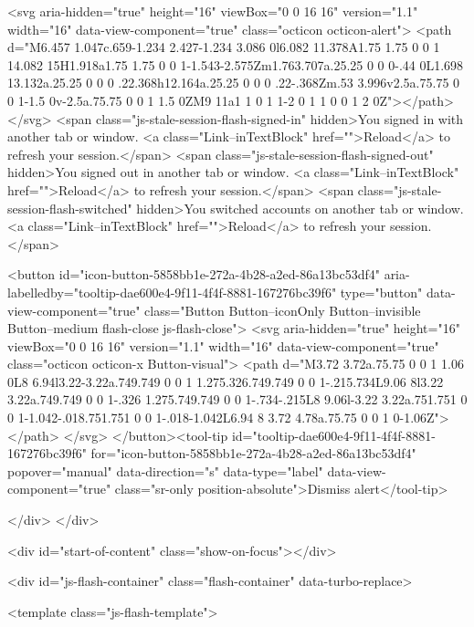         <svg aria-hidden="true" height="16" viewBox="0 0 16 16" version="1.1" width="16" data-view-component="true" class="octicon octicon-alert">
    <path d="M6.457 1.047c.659-1.234 2.427-1.234 3.086 0l6.082 11.378A1.75 1.75 0 0 1 14.082 15H1.918a1.75 1.75 0 0 1-1.543-2.575Zm1.763.707a.25.25 0 0 0-.44 0L1.698 13.132a.25.25 0 0 0 .22.368h12.164a.25.25 0 0 0 .22-.368Zm.53 3.996v2.5a.75.75 0 0 1-1.5 0v-2.5a.75.75 0 0 1 1.5 0ZM9 11a1 1 0 1 1-2 0 1 1 0 0 1 2 0Z"></path>
</svg>
        <span class="js-stale-session-flash-signed-in" hidden>You signed in with another tab or window. <a class="Link--inTextBlock" href="">Reload</a> to refresh your session.</span>
        <span class="js-stale-session-flash-signed-out" hidden>You signed out in another tab or window. <a class="Link--inTextBlock" href="">Reload</a> to refresh your session.</span>
        <span class="js-stale-session-flash-switched" hidden>You switched accounts on another tab or window. <a class="Link--inTextBlock" href="">Reload</a> to refresh your session.</span>

    <button id="icon-button-5858bb1e-272a-4b28-a2ed-86a13bc53df4" aria-labelledby="tooltip-dae600e4-9f11-4f4f-8881-167276bc39f6" type="button" data-view-component="true" class="Button Button--iconOnly Button--invisible Button--medium flash-close js-flash-close">  <svg aria-hidden="true" height="16" viewBox="0 0 16 16" version="1.1" width="16" data-view-component="true" class="octicon octicon-x Button-visual">
    <path d="M3.72 3.72a.75.75 0 0 1 1.06 0L8 6.94l3.22-3.22a.749.749 0 0 1 1.275.326.749.749 0 0 1-.215.734L9.06 8l3.22 3.22a.749.749 0 0 1-.326 1.275.749.749 0 0 1-.734-.215L8 9.06l-3.22 3.22a.751.751 0 0 1-1.042-.018.751.751 0 0 1-.018-1.042L6.94 8 3.72 4.78a.75.75 0 0 1 0-1.06Z"></path>
</svg>
</button><tool-tip id="tooltip-dae600e4-9f11-4f4f-8881-167276bc39f6" for="icon-button-5858bb1e-272a-4b28-a2ed-86a13bc53df4" popover="manual" data-direction="s" data-type="label" data-view-component="true" class="sr-only position-absolute">Dismiss alert</tool-tip>


  
</div>
    </div>

  <div id="start-of-content" class="show-on-focus"></div>








    <div id="js-flash-container" class="flash-container" data-turbo-replace>




  <template class="js-flash-template">
    
